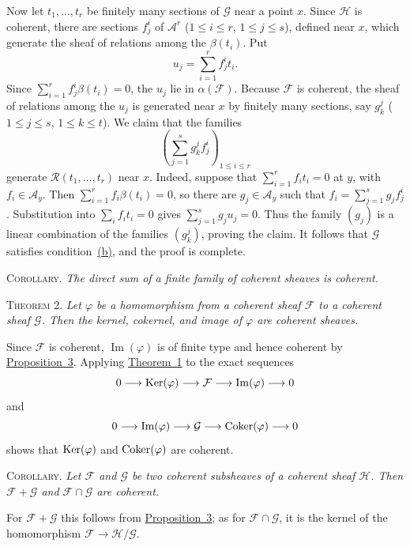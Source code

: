 Now let $t_1,\ldots,t_r$ be finitely many sections of $\mathcal{G}$ near a point $x$. Since $\mathcal{H}$ is coherent, there are sections $f_j^i$ of $\mathcal{A}^r$ ($1\leq i\leq r$, $1\leq j\leq s$), defined near $x$, which generate the sheaf of relations among the $\beta(t_i)$. Put
\[
u_j=\sum_{i=1}^{r}f_j^i t_i.
\]
Since $\sum_{i=1}^{r}f_j^i\beta(t_i)=0$, the $u_j$ lie in $\alpha(\mathcal{F})$. Because $\mathcal{F}$ is coherent, the sheaf of relations among the $u_j$ is generated near $x$ by finitely many sections, say $g_k^j$ ($1\leq j\leq s$, $1\leq k\leq t$). We claim that the families
\[
\left(\sum_{j=1}^{s}g_k^j f_j^i\right)_{1\leq i\leq r}
\]
generate $\mathcal{R}(t_1,\ldots,t_r)$ near $x$. Indeed, suppose that $\sum_{i=1}^{r}f_i t_i=0$ at $y$, with $f_i\in\mathcal{A}_y$. Then $\sum_{i=1}^{r}f_i\beta(t_i)=0$, so there are $g_j\in\mathcal{A}_y$ such that $f_i=\sum_{j=1}^{s}g_j f_j^i$. Substitution into $\sum_i f_i t_i=0$ gives $\sum_{j=1}^{s}g_j u_j=0$. Thus the family $(g_j)$ is a linear combination of the families $(g_k^j)$, proving the claim. It follows that $\mathcal{G}$ satisfies condition~\hyperref[fac:I:2:no:12:def:2:item:b]{(b)}, and the proof is complete.

\label{fac:I:2:no:13:thm:1:cor}
\textsc{Corollary.} \textit{The direct sum of a finite family of coherent sheaves is coherent.}

\label{fac:I:2:no:13:thm:2}
\textsc{Theorem 2.} \textit{Let $\varphi$ be a homomorphism from a coherent sheaf $\mathcal{F}$ to a coherent sheaf $\mathcal{G}$. Then the kernel, cokernel, and image of $\varphi$ are coherent sheaves.}

Since $\mathcal{F}$ is coherent, $\operatorname{Im}(\varphi)$ is of finite type and hence coherent by \hyperref[fac:I:2:no:12:prop:3]{Proposition~3}. Applying \hyperref[fac:I:2:no:13:thm:1]{Theorem~1} to the exact sequences
\[
0\longrightarrow\operatorname{Ker}(\varphi)\longrightarrow\mathcal{F}
\longrightarrow\operatorname{Im}(\varphi)\longrightarrow 0
\]
and
\[
0\longrightarrow\operatorname{Im}(\varphi)\longrightarrow\mathcal{G}
\longrightarrow\operatorname{Coker}(\varphi)\longrightarrow 0
\]
shows that $\operatorname{Ker}(\varphi)$ and $\operatorname{Coker}(\varphi)$ are coherent.

\label{fac:I:2:no:13:thm:2:cor}
\textsc{Corollary.} \textit{Let $\mathcal{F}$ and $\mathcal{G}$ be two coherent subsheaves of a coherent sheaf $\mathcal{H}$. Then $\mathcal{F}+\mathcal{G}$ and $\mathcal{F}\cap\mathcal{G}$ are coherent.}

For $\mathcal{F}+\mathcal{G}$ this follows from \hyperref[fac:I:2:no:12:prop:3]{Proposition~3}; as for $\mathcal{F}\cap\mathcal{G}$, it is the kernel of the homomorphism $\mathcal{F}\to\mathcal{H}/\mathcal{G}$.
